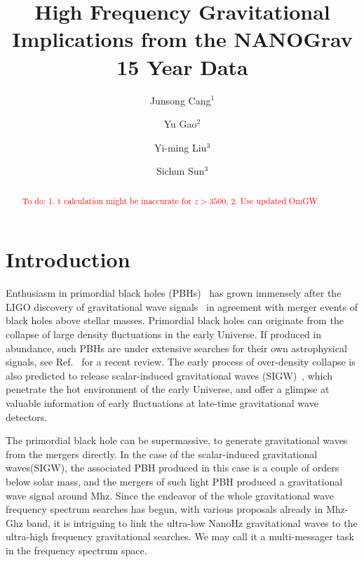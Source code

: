 \documentclass[aps, 10pt, preprintnumbers, prd, amsmath, amssymb,twocolumn, notitlepage, nofootinbib]{revtex4} %
\newcommand{\ckk}[1]{\textcolor{red}{#1}}
\begin{document}
\title{High Frequency Gravitational Implications from the NANOGrav 15 Year Data}
\author{Junsong Cang$^{1}$}
\author{Yu Gao$^{2}$}
\author{Yi-ming Liu$^{3}$}
\author{Sichun Sun$^{3}$}




\begin{abstract}
\ckk{To do:
1. t calculation might be inaccurate for $z>3500$,
2. Use updated OmGW
}
\end{abstract}

\maketitle

\section{Introduction}

Enthusiasm in primordial black holes (PBHs)~\cite{Zeldovich:1967lct,Carr:1974nx} has grown immensely after the LIGO discovery of gravitational wave signals~\cite{} in agreement with merger events of black holes above stellar masses. Primordial black holes can originate from the collapse of large density fluctuations in the early Universe. If produced in abundance, such PBHs are under extensive searches for their own astrophysical signals, see Ref.~\cite{Carr:2021bzv} for a recent review. The early process of over-density collapse is also predicted to release scalar-induced gravitational waves (SIGW)~\cite{}, which penetrate the hot environment of the early Universe, and offer a glimpse at valuable information of early fluctuations at late-time gravitational wave detectors.

{\color{blue}
The primordial black hole can be supermassive, to generate gravitational waves from the mergers directly. In the case of the scalar-induced gravitational waves(SIGW), the associated PBH produced in this case is a couple of orders below solar mass, and the mergers of such light PBH produced a gravitational wave signal around Mhz. Since the endeavor of the whole gravitational wave frequency spectrum searches has begun, with various proposals already in Mhz-Ghz band\cite{}, it is intriguing to link the ultra-low NanoHz gravitational waves to the ultra-high frequency gravitational searches. We may call it a multi-messager task in the frequency spectrum space.
}
\end{document}
